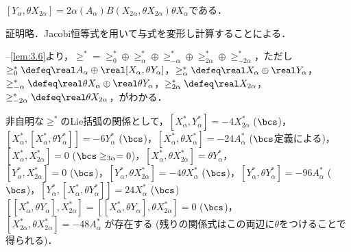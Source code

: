 \begin{lem}\label{lem:3.6}
  $[Y_{\alpha},\theta X_{2\alpha}] = 2\alpha(A_{\alpha})B(X_{2\alpha}, \theta X_{2\alpha})\theta X_{\alpha} $である．

  証明略．Jacobi恒等式を用いて与式を変形し計算することによる．
\end{lem}




\begin{pfwn}{}


  --\ref{lem:3.6}より，$\ge^{*} = \ge^{*}_{0} \oplus \ge^{*}_{\alpha}\oplus \ge^{*}_{-\alpha} \oplus \ge^{*}_{2\alpha} \oplus \ge^{*}_{-2\alpha} $，ただし$\ge^{*}_0 \defeq \real A_{\alpha}\oplus \real[X_{\alpha}, \theta Y_{\alpha}] $，$\ge^{*}_{\alpha} \defeq \real X_{\alpha}\oplus \real Y_{\alpha}  $，$\ge^{*}_{-\alpha} \defeq \real \theta X_{\alpha}\oplus \real \theta Y_{\alpha}  $，$\ge^{*}_{2\alpha} \defeq \real X_{2\alpha} $，$\ge^{*}_{-2\alpha} \defeq \real \theta X_{2\alpha}$，がわかる．

  
  非自明な$\ge^{*} $のLie括弧の関係として，$[X_{\alpha}^{*}, Y_{\alpha}^{*}] = -4X_{2\alpha}^{*} $ ($\bcs$)，$[X_{\alpha}^{*},[X_{\alpha}^{*}, \theta Y_{\alpha}^{*}]]  = -6Y_{\alpha}^{*}$ ($\bcs$)，$[X_{\alpha}^{*}, \theta X_{\alpha}^{*}] = -24A_{\alpha}^{*} $ ($\bcs$定義による)，$[X_{\alpha}^{*},X_{2\alpha}^{*}] = 0$ ($\bcs \ge_{3\alpha} = 0$)，$[X_{\alpha}^{*}, \theta X_{2\alpha}^{*}] = \theta Y_{\alpha}^{*} $，\\
  $[Y_{\alpha}^{*},X_{2\alpha}^{*}] = 0$ ($\bcs$)，$[Y_{\alpha}^{*},\theta X_{2\alpha}^{*}] = -4\theta X_{\alpha}^{*} $ ($\bcs$)，$[Y_{\alpha}^{*}, \theta Y_{\alpha}^{*}] = -96A_{\alpha}^{*} $ ($\bcs$)，$[Y_{\alpha}^{*}, [X_{\alpha}^{*}, \theta Y_{\alpha}^{*}]] = 24X_{\alpha}^{*} $ ($\bcs$) \\
  $[[X_{\alpha}^{*}, \theta Y_{\alpha}], X_{2\alpha}^{*}] = [[X_{\alpha}^{*}, \theta Y_{\alpha}], \theta X_{2\alpha}^{*}] = 0$ ($\bcs$)，\\
  $[X_{2\alpha}^{*} ,\theta X_{2\alpha}^{*} ] = -48A_{\alpha}^{*} $
  が存在する (残りの関係式はこの両辺に$\theta$をつけることで得られる)．
  

\end{pfwn}
